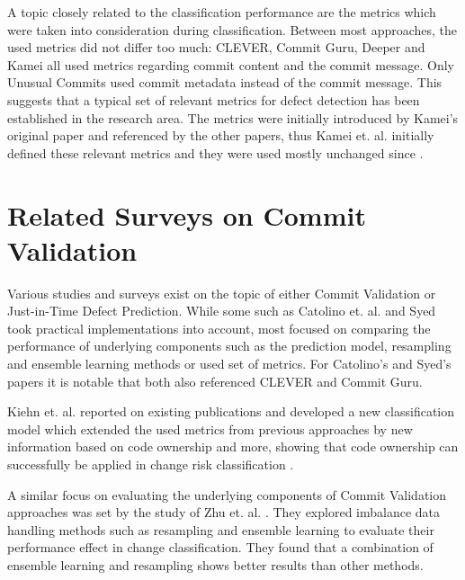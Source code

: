 A topic closely related to the classification performance are the metrics which were taken into consideration during classification. Between most approaches, the used metrics did not differ too much: CLEVER, Commit Guru, Deeper and Kamei all used metrics regarding commit content and the commit message. Only Unusual Commits used commit metadata instead of the commit message. This suggests that a typical set of relevant metrics for defect detection has been established in the research area. The metrics were initially introduced by Kamei's original paper and referenced by the other papers, thus Kamei et. al. initially defined these relevant metrics and they were used mostly unchanged since \cite{Kamei2013}.




\section{Related Surveys on Commit Validation}
\label{sec:relatedsurveys}

Various studies and surveys exist
on the topic of either Commit Validation or Just-in-Time Defect Prediction. While some such as Catolino et. al. \cite{Catolino2019} and Syed \cite{Syed2019} took practical implementations into account, most focused on comparing the performance of underlying components such as the prediction model, resampling and ensemble learning methods or used set of metrics. For Catolino's and Syed's papers it is notable that both also referenced CLEVER and Commit Guru.

Kiehn et. al. reported on existing publications and developed a new classification model which extended the used metrics from previous approaches by new information based on code ownership and more, showing that code ownership can successfully be applied in change risk classification \cite{Kiehn2019}.

A similar focus on evaluating the underlying components of Commit Validation approaches was set by the study of Zhu et. al. \cite{Zhu2018}. They explored imbalance data handling methods such as resampling and ensemble learning to evaluate their performance effect in change classification. They found that a combination of ensemble learning and resampling shows better results than other methods. 

